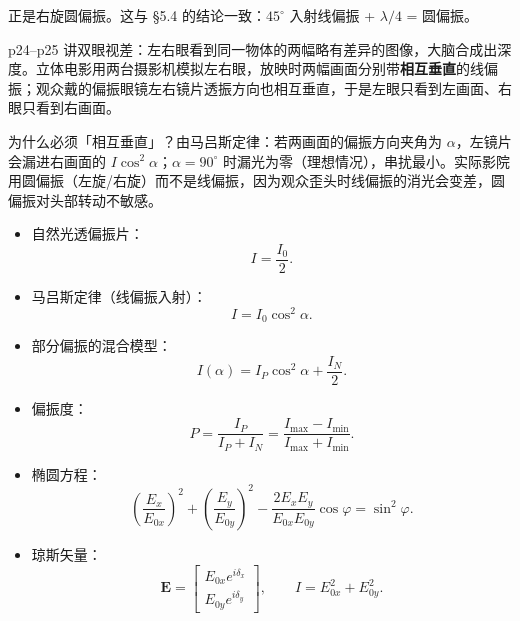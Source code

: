 \documentclass[11pt]{ctexart}
\begin{document}
正是右旋圆偏振。这与 §5.4 的结论一致：$45^\circ$ 入射线偏振 + $\lambda/4$ = 圆偏振。




p24--p25 讲双眼视差：左右眼看到同一物体的两幅略有差异的图像，大脑合成出深度。立体电影用两台摄影机模拟左右眼，放映时两幅画面分别带\textbf{相互垂直}的线偏振；观众戴的偏振眼镜左右镜片透振方向也相互垂直，于是左眼只看到左画面、右眼只看到右画面。

为什么必须「相互垂直」？由马吕斯定律：若两画面的偏振方向夹角为 $\alpha$，左镜片会漏进右画面的 $I\cos^2\alpha$；$\alpha=90^\circ$ 时漏光为零（理想情况），串扰最小。实际影院用圆偏振（左旋/右旋）而不是线偏振，因为观众歪头时线偏振的消光会变差，圆偏振对头部转动不敏感。



\begin{itemize}
\item 自然光透偏振片：
\[ I=\frac{I_0}{2}. \]
\item 马吕斯定律（线偏振入射）：
\[ I=I_0\cos^2\alpha . \]
\item 部分偏振的混合模型：
\[ I(\alpha)=I_P\cos^2\alpha+\frac{I_N}{2}. \]
\item 偏振度：
\[ P=\frac{I_P}{I_P+I_N}=\frac{I_{\max}-I_{\min}}{I_{\max}+I_{\min}} . \]
\item 椭圆方程：
\[ \left(\frac{E_x}{E_{0x}}\right)^2+\left(\frac{E_y}{E_{0y}}\right)^2
-\frac{2E_xE_y}{E_{0x}E_{0y}}\cos\varphi=\sin^2\varphi . \]
\item 琼斯矢量：
\[ \mathbf{E}=\begin{bmatrix}E_{0x}e^{i\delta_x}\\ E_{0y}e^{i\delta_y}\end{bmatrix},\qquad
I=E_{0x}^2+E_{0y}^2 . \]
\end{itemize}
\end{document}
